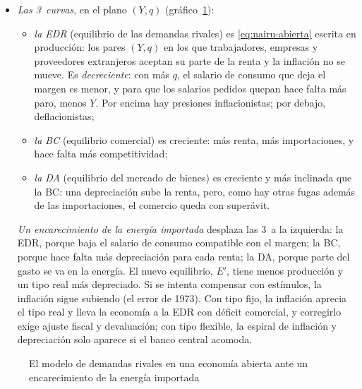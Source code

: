 \documentclass[11pt]{article}
\begin{document}
\begin{itemize}
\item \emph{Las 3~curvas}, en el plano $(Y,q)$\nocite{LayardNickellJackman1991Unemployment,CarlinSoskice2015Macroeconomics} (gráfico~\ref{fig:demandas-rivales}):
  \begin{itemize}
  \item \emph{la EDR} (equilibrio de las demandas rivales) es \eqref{eq:nairu-abierta} escrita en producción: los pares $(Y,q)$ en los que trabajadores, empresas y proveedores extranjeros aceptan su parte de la renta y la inflación no se mueve. Es \emph{decreciente}: con más $q$, el salario de consumo que deja el margen es menor, y para que los salarios pedidos quepan hace falta más paro, menos $Y$. Por encima hay presiones inflacionistas; por debajo, deflacionistas;
  \item \emph{la BC} (equilibrio comercial) es creciente: más renta, más importaciones, y hace falta más competitividad;
  \item \emph{la DA} (equilibrio del mercado de bienes) es creciente y más inclinada que la BC: una depreciación sube la renta, pero, como hay otras fugas además de las importaciones, el comercio queda con superávit.
  \end{itemize}
  \emph{Un encarecimiento de la energía importada} desplaza las 3~a la izquierda: la EDR, porque baja el salario de consumo compatible con el margen; la BC, porque hace falta más depreciación para cada renta; la DA, porque parte del gasto se va en la energía. El nuevo equilibrio, $E'$, tiene menos producción y un tipo real más depreciado. Si se intenta compensar con estímulos, la inflación sigue subiendo (el error de 1973). Con tipo fijo, la inflación aprecia el tipo real y lleva la economía a la EDR con déficit comercial, y corregirlo exige ajuste fiscal y devaluación; con tipo flexible, la espiral de inflación y depreciación solo aparece si el banco central acomoda.
\end{itemize}

\begin{figure}[H]
\centering
\caption{El modelo de demandas rivales en una economía abierta ante un encarecimiento de la energía importada}\label{fig:demandas-rivales}
\end{figure}
\end{document}
